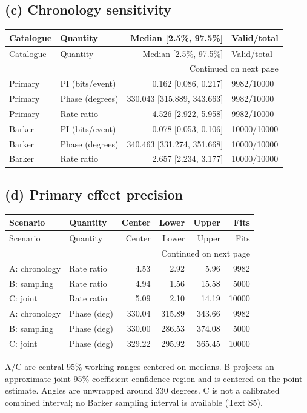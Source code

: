 \subsection*{(c) Chronology sensitivity}
{\small
\begin{longtable}{llrl}
\toprule
Catalogue & Quantity & Median [2.5\%, 97.5\%] & Valid/total \\
\midrule
\endfirsthead
\toprule
Catalogue & Quantity & Median [2.5\%, 97.5\%] & Valid/total \\
\midrule
\endhead
\midrule
\multicolumn{4}{r}{Continued on next page} \\
\midrule
\endfoot
\bottomrule
\endlastfoot
Primary & PI (bits/event) & 0.162 [0.086, 0.217] & 9982/10000 \\
Primary & Phase (degrees) & 330.043 [315.889, 343.663] & 9982/10000 \\
Primary & Rate ratio & 4.526 [2.922, 5.958] & 9982/10000 \\
Barker & PI (bits/event) & 0.078 [0.053, 0.106] & 10000/10000 \\
Barker & Phase (degrees) & 340.463 [331.274, 351.668] & 10000/10000 \\
Barker & Rate ratio & 2.657 [2.234, 3.177] & 10000/10000 \\
\end{longtable}
}
\subsection*{(d) Primary effect precision}
{\small
\begin{longtable}{llrrrr}
\toprule
Scenario & Quantity & Center & Lower & Upper & Fits \\
\midrule
\endfirsthead
\toprule
Scenario & Quantity & Center & Lower & Upper & Fits \\
\midrule
\endhead
\midrule
\multicolumn{6}{r}{Continued on next page} \\
\midrule
\endfoot
\bottomrule
\endlastfoot
A: chronology & Rate ratio & 4.53 & 2.92 & 5.96 & 9982 \\
B: sampling & Rate ratio & 4.94 & 1.56 & 15.58 & 5000 \\
C: joint & Rate ratio & 5.09 & 2.10 & 14.19 & 10000 \\
A: chronology & Phase (deg) & 330.04 & 315.89 & 343.66 & 9982 \\
B: sampling & Phase (deg) & 330.00 & 286.53 & 374.08 & 5000 \\
C: joint & Phase (deg) & 329.22 & 295.92 & 365.45 & 10000 \\
\end{longtable}
}
A/C are central 95\% working ranges centered on medians. B projects an approximate joint 95\% coefficient confidence region and is centered on the point estimate. Angles are unwrapped around 330 degrees. C is not a calibrated combined interval; no Barker sampling interval is available (Text S5).
